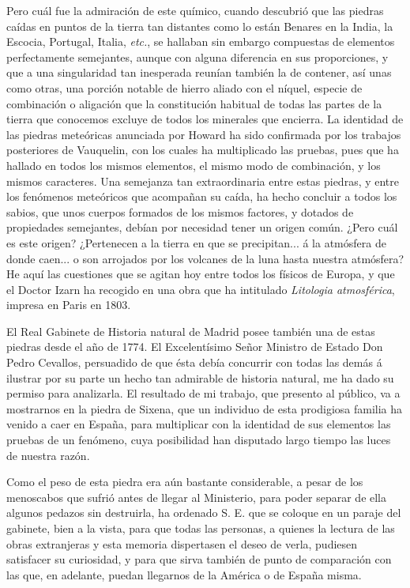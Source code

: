 \documentclass[a4paper, 11pt, oneside, polutonikogreek, spanish]{article}
\begin{document}
Pero cuál fue la admiración de este químico, cuando descubrió que las piedras caídas en puntos de la tierra tan distantes como lo están Benares en la India, la Escocia, Portugal, Italia, \emph{etc.}, se hallaban sin embargo compuestas de elementos perfectamente semejantes, aunque con alguna diferencia en sus proporciones, y que a una singularidad tan inesperada reunían también la de contener, así unas como otras, una porción notable de hierro aliado con el níquel, especie de combinación o aligación que la constitución habitual de todas las partes de la tierra que conocemos excluye de todos los minerales que encierra. La identidad de las piedras meteóricas anunciada por Howard ha sido confirmada por los trabajos posteriores de Vauquelin, con los cuales ha multiplicado las pruebas, pues que ha hallado en todos los mismos elementos, el mismo modo de combinación, y los mismos caracteres. Una semejanza tan extraordinaria entre estas piedras, y entre los fenómenos meteóricos que acompañan su caída, ha hecho concluir a todos los sabios, que unos cuerpos formados de los mismos factores, y dotados de propiedades semejantes, debían por necesidad tener un origen común. ¿Pero cuál es este origen? ¿Pertenecen a la tierra en que se precipitan... á la atmósfera de donde caen... o son arrojados por los volcanes de la luna hasta nuestra atmósfera? He aquí las cuestiones que se agitan hoy entre todos los físicos de Europa, y que el Doctor Izarn ha recogido en una obra que ha intitulado \emph{Litologia atmosférica}, impresa en Paris en 1803.

El Real Gabinete de Historia natural de Madrid posee también una de estas piedras desde el año de 1774. El Excelentísimo Señor Ministro de Estado Don Pedro Cevallos, persuadido de que ésta debía concurrir con todas las demás á ilustrar por su parte un hecho tan admirable de historia natural, me ha dado su permiso para analizarla. El resultado de mi trabajo, que presento al público, va a mostrarnos en la piedra de Sixena, que un individuo de esta prodigiosa familia ha venido a caer en España, para multiplicar con la identidad de sus elementos las pruebas de un fenómeno, cuya posibilidad han disputado largo tiempo las luces de nuestra razón.

Como el peso de esta piedra era aún bastante considerable, a pesar de los menoscabos que sufrió antes de llegar al Ministerio, para poder separar de ella algunos pedazos sin destruirla, ha ordenado S. E. que se coloque en un paraje del gabinete, bien a la vista, para que todas las personas, a quienes la lectura de las obras extranjeras y esta memoria dispertasen el deseo de verla, pudiesen satisfacer su curiosidad, y para que sirva también de punto de comparación con las que, en adelante, puedan llegarnos de la América o de España misma.
\end{document}
